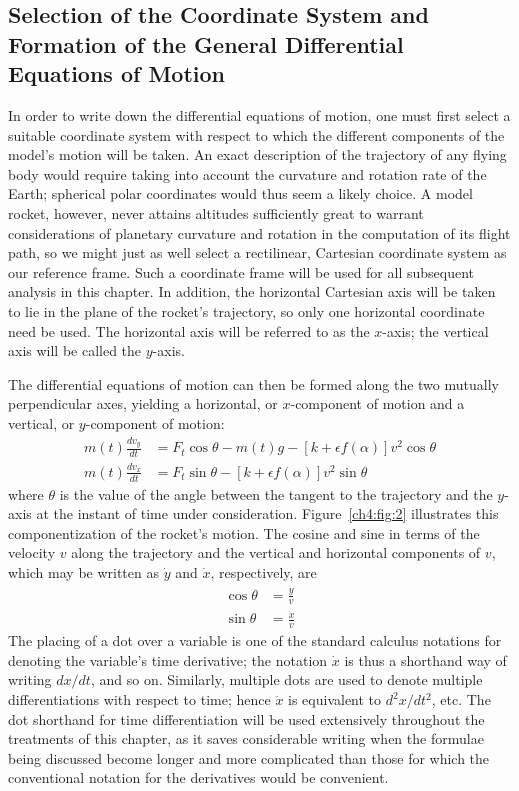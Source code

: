 \subsection{Selection of the Coordinate System and Formation of the General Differential Equations
of Motion}\label{ch4:sec:1.2}

In order to write down the differential equations of motion, one must first select a suitable
coordinate system with respect to which the different components of the model's motion will be
taken. An exact description of the trajectory of any flying body would require taking into account
the curvature and rotation rate of the Earth; spherical polar coordinates would thus seem a likely
choice. A model rocket, however, never attains altitudes sufficiently great to warrant
considerations of planetary curvature and rotation in the computation of its flight path, so we
might just as well select a rectilinear, Cartesian coordinate system as our reference frame. Such a
coordinate frame will be used for all subsequent analysis in this chapter. In addition, the
horizontal Cartesian axis will be taken to lie in the plane of the rocket's trajectory, so only one
horizontal coordinate need be used. The horizontal axis will be referred to as the $x$-axis; the
vertical axis will be called the $y$-axis.

The differential equations of motion can then be formed along the two mutually perpendicular axes,
yielding a horizontal, or $x$-component of motion and a vertical, or $y$-component of motion:
\begin{align}
m(t)\frac{dv_y}{dt} &= F_t\cos\theta - m(t)g - [k + \epsilon f(\alpha)]v^{2}\cos\theta
  \label{ch4:eq:12}\\
m(t)\frac{dv_x}{dt} &= F_t\sin\theta - [k + \epsilon f(\alpha)]v^{2}\sin\theta \label{ch4:eq:13}
\end{align}
where $\theta$ is the value of the angle between the tangent to the trajectory and the $y$-axis at
the instant of time under consideration. Figure~\ref{ch4:fig:2} illustrates this
componentization of the rocket's motion. The cosine and sine in terms of the velocity $v$ along the
trajectory and the vertical and horizontal components of $v$, which may be written as $\dot{y}$ and
$\dot{x}$, respectively, are
\begin{align}
\cos\theta &= \frac{\dot{y}}{v} \label{ch4:eq:14}\\
\sin\theta &= \frac{\dot{x}}{v} \label{ch4:eq:15}
\end{align}
The placing of a dot over a variable is one of the standard calculus notations for denoting the
variable's time derivative; the notation $\dot{x}$ is thus a shorthand way of writing $dx/dt$, and
so on. Similarly, multiple dots are used to denote multiple differentiations with respect to time;
hence $\ddot{x}$ is equivalent to $d^{2}x/dt^{2}$, etc. The dot shorthand for time differentiation
will be used extensively throughout the treatments of this chapter, as it saves considerable
writing when the formulae being discussed become longer and more complicated than those for which
the conventional notation for the derivatives would be convenient.


